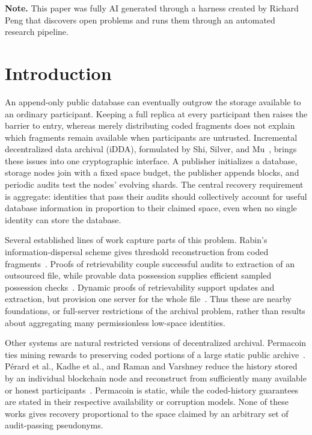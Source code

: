 \documentclass[11pt]{article}
\begin{document}
\noindent\textbf{Note.} This paper was fully AI generated through a harness created by Richard Peng that discovers open problems and runs them through an automated research pipeline.\par

\clearpage
\tableofcontents
\clearpage


\section{Introduction}

\label{sec:introduction}

An append-only public database can eventually outgrow the storage available to
an ordinary participant.  Keeping a full replica at every participant then
raises the barrier to entry, whereas merely distributing coded fragments does
not explain which fragments remain available when participants are
untrusted.  Incremental decentralized data archival (iDDA), formulated by
Shi, Silver, and Mu~\cite{ShiSilverMu2026}, brings these issues into one
cryptographic interface.  A publisher initializes a database, storage nodes
join with a fixed space budget, the publisher appends blocks, and periodic
audits test the nodes' evolving shards.  The central recovery requirement is
aggregate: identities that pass their audits should collectively account for
useful database information in proportion to their claimed space, even when
no single identity can store the database.

Several established lines of work capture parts of this problem.  Rabin's
information-dispersal scheme gives threshold reconstruction from coded
fragments~\cite{Rabin1989InformationDispersal}.  Proofs of retrievability
couple successful audits to extraction of an outsourced file, while provable
data possession supplies efficient sampled possession
checks~\cite{JuelsKaliski2007PoR,AtenieseEtAl2007PDP}.  Dynamic proofs of
retrievability support updates and extraction, but provision one server for
the whole file~\cite{CashKupcuWichs2013DynamicPoR,
ShiStefanovPapamanthou2013PracticalDynamicPoR}.  Thus these are nearby
foundations, or full-server restrictions of the archival problem, rather than
results about aggregating many permissionless low-space identities.

Other systems are natural restricted versions of decentralized archival.
Permacoin ties mining rewards to preserving coded portions of a large static
public archive~\cite{MillerJuelsShiParnoKatz2014Permacoin}.  P\'erard et al.,
Kadhe et al., and Raman and Varshney reduce the history stored by an individual
blockchain node and reconstruct from sufficiently many available or honest
participants~\cite{PerardLacanBachyDetchart2018LowStorage,
KadheChungRamchandran2019SeF,RamanVarshney2021Coding}.  Permacoin is static,
while the coded-history guarantees are stated in their respective availability
or corruption models.  None of these works gives recovery proportional to the
space claimed by an arbitrary set of audit-passing pseudonyms.
\end{document}
